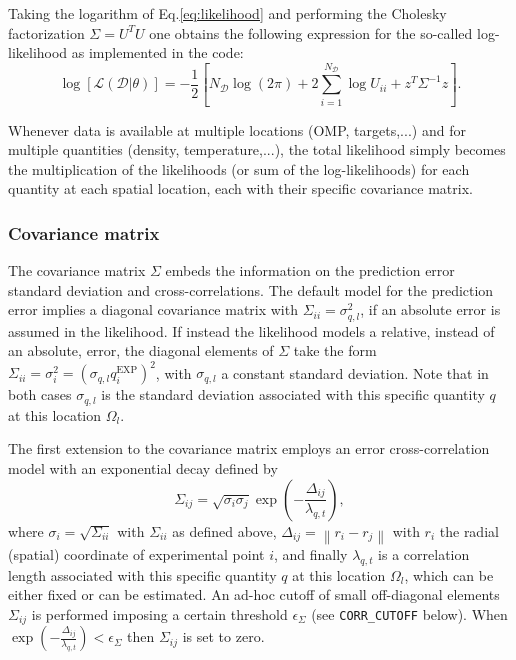 Taking the logarithm of Eq.\ref{eq:likelihood} and performing the Cholesky factorization $\Sigma=U^TU$ one obtains the following expression for the so-called log-likelihood as implemented in the code:
\begin{equation}\label{eq:loglikelihood}
	\log\left[ \mathcal{L}(\mathcal{D}\vert\theta)\right]=-\frac{1}{2}\left[N_\mathcal{D}\log\left(2\pi\right) + 2\sum_{i=1}^{N_\mathcal{D}}\log{U_{ii}} + z^T\Sigma^{-1}z \right].
\end{equation}

Whenever data is available at multiple locations (OMP, targets,...) and for multiple quantities (density, temperature,...), the total likelihood simply becomes the multiplication of the likelihoods (or sum of the log-likelihoods) for each quantity at each spatial location, each with their specific covariance matrix.

\subsubsection{Covariance matrix}
The covariance matrix $\Sigma$ embeds the information on the prediction error standard deviation and cross-correlations. The default model for the prediction error implies a diagonal covariance matrix with $\Sigma_{ii}=\sigma_{q,l}^2$, if an absolute error is assumed in the likelihood. If instead the likelihood models a relative, instead of an absolute, error, the diagonal elements of $\Sigma$ take the form $\Sigma_{ii}=\sigma_i^2=(\sigma_{q,l} q_i^{\mathrm{EXP}})^2$, with $\sigma_{q,l}$ a constant standard deviation. Note that in both cases $\sigma_{q,l}$ is the standard deviation associated with this specific quantity $q$ at this location $\Omega_l$.

The first extension to the covariance matrix employs an error cross-correlation model with an exponential decay defined by
\begin{equation}\label{eq:correlation_1}
	\Sigma_{ij} = \sqrt{\sigma_i\sigma_j} \exp\left(-\frac{\Delta_{ij}}{\lambda_{q,t}}\right),
\end{equation}
where $\sigma_i=\sqrt{\Sigma_{ii}}$ with $\Sigma_{ii}$ as defined above, $\Delta_{ij}=\left\| r_i -r_j \right\|$ with $r_i$ the radial (spatial) coordinate of experimental point $i$, and finally $\lambda_{q,t}$ is a correlation length associated with this specific quantity $q$ at this location $\Omega_l$, which can be either fixed or can be estimated. An ad-hoc cutoff of small off-diagonal elements $\Sigma_{ij}$ is performed imposing a certain threshold $\epsilon_\Sigma$ (see {\tt CORR\_CUTOFF} below). When $\exp\left(-\frac{\Delta_{ij}}{\lambda_{q,t}}\right)<\epsilon_\Sigma$ then $\Sigma_{ij}$ is set to zero.

